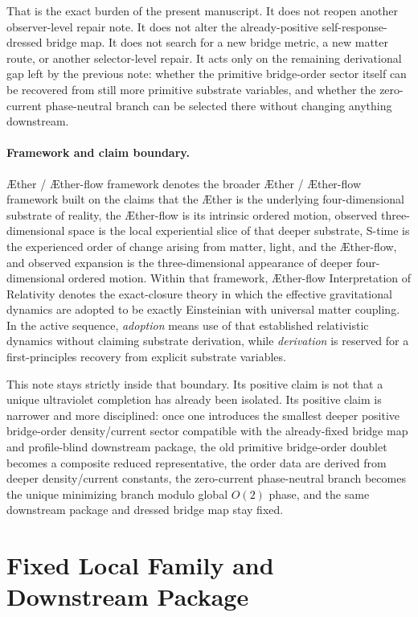 \documentclass[11pt]{article}
\newcommand{\Aether}{\AE{}ther}
\newcommand{\Aflow}{\AE{}ther-flow}
\newcommand{\TheoryName}{\Aflow{} Interpretation of Relativity}
\newcommand{\TheoryProgram}{\Aether{} / \Aflow{} framework}
\begin{document}
That is the exact burden of the present manuscript. It does not reopen another observer-level repair note. It does not alter the already-positive self-response-dressed bridge map. It does not search for a new bridge metric, a new matter route, or another selector-level repair. It acts only on the remaining derivational gap left by the previous note: whether the primitive bridge-order sector itself can be recovered from still more primitive substrate variables, and whether the zero-current phase-neutral branch can be selected there without changing anything downstream.

\paragraph{Framework and claim boundary.}
\TheoryProgram{} denotes the broader \Aether{} / \Aflow{} framework built on the claims that the \Aether{} is the underlying four-dimensional substrate of reality, the \Aflow{} is its intrinsic ordered motion, observed three-dimensional space is the local experiential slice of that deeper substrate, S-time is the experienced order of change arising from matter, light, and the \Aflow{}, and observed expansion is the three-dimensional appearance of deeper four-dimensional ordered motion. Within that framework, \TheoryName{} denotes the exact-closure theory in which the effective gravitational dynamics are adopted to be exactly Einsteinian with universal matter coupling. In the active sequence, \emph{adoption} means use of that established relativistic dynamics without claiming substrate derivation, while \emph{derivation} is reserved for a first-principles recovery from explicit substrate variables.

This note stays strictly inside that boundary. Its positive claim is not that a unique ultraviolet completion has already been isolated. Its positive claim is narrower and more disciplined: once one introduces the smallest deeper positive bridge-order density/current sector compatible with the already-fixed bridge map and profile-blind downstream package, the old primitive bridge-order doublet becomes a composite reduced representative, the order data are derived from deeper density/current constants, the zero-current phase-neutral branch becomes the unique minimizing branch modulo global \(O(2)\) phase, and the same downstream package and dressed bridge map stay fixed.

\section{Fixed Local Family and Downstream Package}
\end{document}
